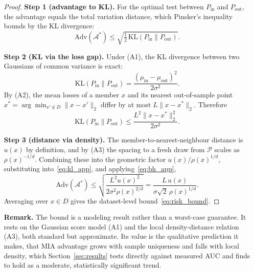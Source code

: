 \begin{proof}
\textbf{Step 1 (advantage to KL).}
For the optimal test between $P_{\mathrm{in}}$ and $P_{\mathrm{out}}$,
the advantage equals the total variation distance, which Pinsker's
inequality~\cite{tsybakov2009introduction} bounds by the KL divergence:
\begin{equation}
  \mathrm{Adv}(\mathcal{A}^*) \leq
  \sqrt{\tfrac{1}{2}\,\mathrm{KL}(P_{\mathrm{in}} \| P_{\mathrm{out}})}.
  \label{eq:bh_app}
\end{equation}

\textbf{Step 2 (KL via the loss gap).}
Under (A1), the KL divergence between two Gaussians of common variance is
exact:
\begin{equation}
  \mathrm{KL}(P_{\mathrm{in}} \| P_{\mathrm{out}})
  = \frac{(\mu_{\mathrm{in}} - \mu_{\mathrm{out}})^2}{2\sigma^2}.
\end{equation}
By (A2), the mean losses of a member $x$ and its nearest out-of-sample point
$x^* = \arg\min_{x' \notin D}\|x-x'\|_2$ differ by at most $L\|x-x^*\|_2$.
Therefore
\begin{equation}
  \mathrm{KL}(P_{\mathrm{in}} \| P_{\mathrm{out}})
  \leq \frac{L^2 \|x - x^*\|_2^2}{2\sigma^2}.
  \label{eq:kl_app}
\end{equation}

\textbf{Step 3 (distance via density).}
The member-to-nearest-neighbour distance is $u(x)$ by definition, and by (A3)
the spacing to a fresh draw from $\mathcal{P}$ scales as $\rho(x)^{-1/d}$.
Combining these into the geometric factor $u(x)/\rho(x)^{1/d}$, substituting
into~\eqref{eq:kl_app}, and applying~\eqref{eq:bh_app},
\begin{equation}
  \mathrm{Adv}(\mathcal{A}^*) \leq
  \sqrt{\frac{L^2 u(x)^2}{2\sigma^2 \rho(x)^{2/d}}}
  = \frac{L\, u(x)}{\sigma\sqrt{2}\,\rho(x)^{1/d}}.
\end{equation}
Averaging over $x \in D$ gives the dataset-level bound~\eqref{eq:risk_bound}.
\end{proof}

\noindent\textbf{Remark.} The bound is a modeling result rather than a
worst-case guarantee. It rests on the Gaussian score model (A1) and the local
density-distance relation (A3), both standard but approximate. Its value is
the qualitative prediction it makes, that MIA advantage grows with sample
uniqueness and falls with local density, which Section~\ref{sec:results}
tests directly against measured AUC and finds to hold as a moderate,
statistically significant trend.

